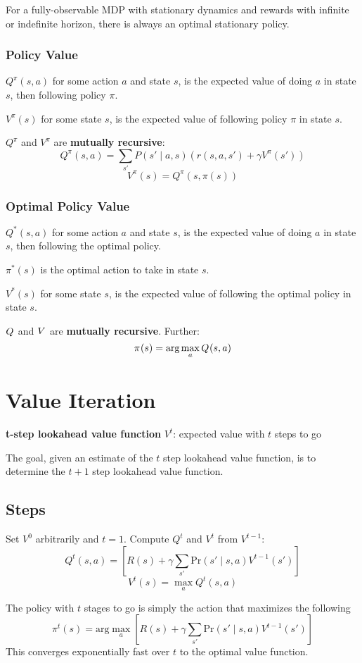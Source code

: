 \documentclass[11pt]{article}
\begin{document}
For a fully-observable MDP with stationary dynamics and rewards with infinite
or indefinite horizon, there is always an optimal stationary policy.
\subsubsection{Policy Value}
\label{sec:org3db640f}
\(Q^{\pi}(s, a)\) for some action \(a\) and state \(s\), is the expected value of
doing \(a\) in state \(s\), then following policy \(\pi\).

\(V^{\pi}(s)\) for some state \(s\), is the expected value of following policy
\(\pi\) in state \(s\).

\(Q^{\pi}\) and \(V^{\pi}\) are \textbf{mutually recursive}:
$$ Q^{\pi}(s,a) = \sum_{s'} P(s' \mid a, s) ( r(s, a, s') + \gamma V^{\pi}(s') ) $$
$$ V^{\pi}(s) = Q^{\pi}(s, \pi(s)) $$
\subsubsection{Optimal Policy Value}
\label{sec:org80eef6b}
\(Q^{*}(s, a)\) for some action \(a\) and state \(s\), is the expected value of
doing \(a\) in state \(s\), then following the optimal policy.

\(\pi^{*}(s)\) is the optimal action to take in state \(s\).

\(V^{*}(s)\) for some state \(s\), is the expected value of following the optimal
policy in state \(s\).

\(Q^{\*}\) and \(V^{\*}\) are \textbf{mutually recursive}.
Further:
$$ \pi^{\*}(s) = \text{arg} \max_{a} Q^{\*}(s,a) $$
\section{Value Iteration}
\label{sec:org0d83d6f}
\textbf{t-step lookahead value function} \(V^{t}\): expected value with \(t\) steps to go

The goal, given an estimate of the \(t\) step lookahead value function, is to
determine the \(t+1\) step lookahead value function.
\subsection{Steps}
\label{sec:org323e3a2}
Set \(V^{0}\) arbitrarily and \(t = 1\).
Compute \(Q^{t}\) and \(V^{t}\) from \(V^{t-1}\):
$$ Q^{t}(s,a) = \left[ R(s) + \gamma \sum_{s'} \text{Pr}(s' \mid s, a) V^{t-1} (s') \right] $$
$$ V^{t}(s) = \max_{a} Q^{t} (s,a) $$

The policy with \(t\) stages to go is simply the action that maximizes the following
$$ \pi^{t}(s) = \text{arg} \max_{a} [R(s) + \gamma \sum_{s'} \text{Pr}(s' \mid s, a) V^{t-1}(s')] $$
This converges exponentially fast over \(t\) to the optimal value function.
\end{document}
